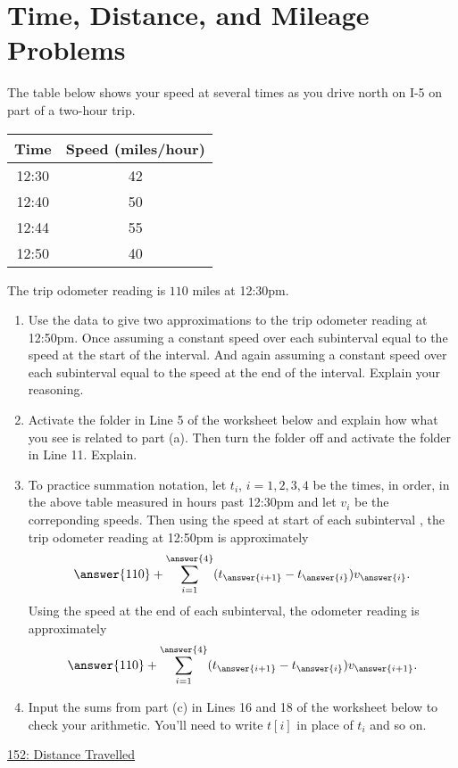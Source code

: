 \documentclass{ximera}
\begin{document}
\section{Time, Distance, and Mileage Problems}

\begin{exercise}  \label{EXKDmFMERE}
The table below shows your speed at several times as you drive north on I-5 on part of a two-hour trip. 

\begin{tabular}{|c|c|}
\hline
Time & Speed (miles/hour) \\
\hline
12:30 & 42 \\  \hline
12:40 & 50 \\ \hline
12:44 & 55 \\ \hline
12:50 & 40 \\
\hline
\end{tabular}

The trip odometer reading is $110$ miles at 12:30pm.


\begin{enumerate}
\item Use the data to give two approximations to the trip odometer reading at 12:50pm. Once assuming a constant speed over each subinterval equal to the speed at the start of the interval. And again assuming a constant speed over each subinterval equal to the speed at the end of the interval. Explain your reasoning.

\item Activate the folder in Line 5 of the worksheet below and explain how what you see is related to part (a). Then turn the folder off and activate the folder in Line 11. Explain. 

\item To practice summation notation, let $t_i$, $i=1,2,3,4$ be the times, in order, in the above table measured in hours past 12:30pm and let $v_i$ be the correponding speeds. Then using the speed at start of each subinterval , the trip odometer reading at 12:50pm is approximately 
\[
         \answer{110} +    \sum_{i=1}^{\answer{4}}(t_{\answer{i+1}} - t_{\answer{i}})v_{\answer{i}}. 
\]
Using the speed at the end of each subinterval, the odometer reading is approximately
\[
   \answer{110} +     \sum_{i=1}^{\answer{4}}(t_{\answer{i+1}} - t_{\answer{i}})v_{\answer{i+1}}.
\]

\item Input the sums from part (c) in Lines 16 and 18 of the worksheet below to check your arithmetic. You'll need to write $t[i]$ in place of $t_i$ and so on.
\end{enumerate}

\begin{onlineOnly}
    \begin{center}
\end{center}
\end{onlineOnly}

\href{https://www.desmos.com/calculator/jjobuctzsa}{152: Distance Travelled}
\end{exercise}
\end{document}

